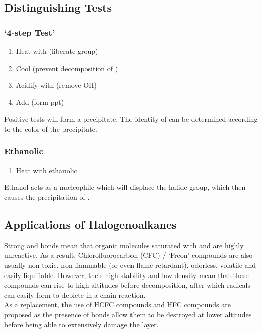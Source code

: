 \documentclass[../main]{subfiles}
\begin{document}
	\subsection{Distinguishing Tests}

	\subsubsection{`4-step Test'}

	\begin{enumerate}
		\item Heat with  (liberate  group)
		\item Cool (prevent decomposition of )
		\item Acidify with  (remove OH)
		\item Add  (form ppt)
	\end{enumerate}

	Positive tests will form a  precipitate. The identity of  can be determined according to the color of the precipitate. \\

	\subsubsection{Ethanolic }

	\begin{enumerate}
		\item Heat with ethanolic 
	\end{enumerate}

	Ethanol acts as a nucleophile which will displace the halide group, which then causes the precipitation of .

	\subsection{Applications of Halogenoalkanes}

	Strong  and  bonds mean that organic molecules saturated with  and  are highly unreactive. As a result, Chlorofluorocarbon (CFC) / `Freon' compounds are also usually non-toxic, non-flammable (or even flame retardant), odorless, volatile and easily liquifiable. However, their high stability and low density mean that these compounds can rise to high altitudes before decomposition, after which  radicals can easily form to deplete  in a chain reaction. \\

	As a replacement, the use of HCFC compounds and HFC compounds are proposed as the presence of  bonds allow them to be destroyed at lower altitudes before being able to extensively damage the  layer.
	
\end{document}
